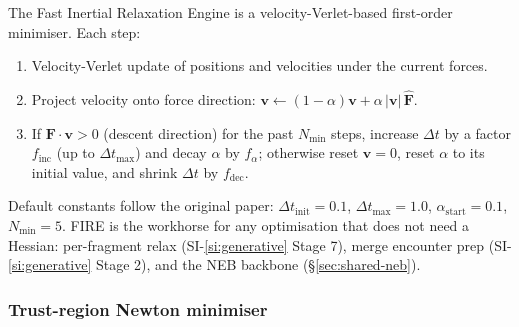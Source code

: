 The Fast Inertial Relaxation Engine \citep[][used force-only]{bitzek2006fire} is a velocity-Verlet-based first-order minimiser. Each step:
\begin{enumerate}
    \item Velocity-Verlet update of positions and velocities under the current forces.
    \item Project velocity onto force direction: $\mathbf{v} \leftarrow (1-\alpha)\mathbf{v} + \alpha\,|\mathbf{v}|\,\hat{\mathbf{F}}$.
    \item If $\mathbf{F} \cdot \mathbf{v} > 0$ (descent direction) for the past $N_\text{min}$ steps, increase $\Delta t$ by a factor $f_\text{inc}$ (up to $\Delta t_\text{max}$) and decay $\alpha$ by $f_\alpha$; otherwise reset $\mathbf{v} = 0$, reset $\alpha$ to its initial value, and shrink $\Delta t$ by $f_\text{dec}$.
\end{enumerate}
Default constants follow the original paper: $\Delta t_\text{init} = 0.1$, $\Delta t_\text{max} = 1.0$, $\alpha_\text{start} = 0.1$, $N_\text{min} = 5$. FIRE is the workhorse for any optimisation that does not need a Hessian: per-fragment relax (SI-\ref{si:generative} Stage 7), merge encounter prep (SI-\ref{si:generative} Stage 2), and the NEB backbone (\S\ref{sec:shared-neb}).


\subsubsection{Trust-region Newton minimiser}
\label{sec:shared-newton}

